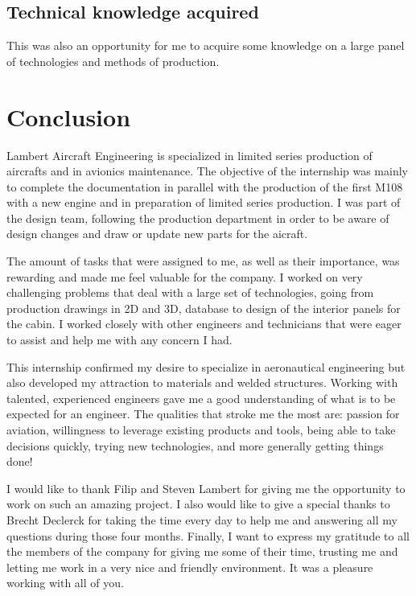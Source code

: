 \documentclass[11pt,a4paper]{article}
\begin{document}
\subsection{Technical knowledge acquired}
This was also an opportunity for me to acquire some knowledge on a large panel of technologies and methods of production.

\newpage

\section{Conclusion}
Lambert Aircraft Engineering is specialized in limited series production of aircrafts and in avionics maintenance. The objective of the internship was mainly to complete the documentation in parallel with the production of the first M108 with a new engine and in preparation of limited series production. I was part of the design team, following the production department in order to be aware of design changes and draw or update new parts for the aicraft.

\bigskip

The amount of tasks that were assigned to me, as well as their importance, was rewarding and made me feel valuable for the company. I worked on very challenging problems that deal with a large set of technologies, going from production drawings in 2D and 3D, database to design of the interior panels for the cabin. I worked closely with other engineers and technicians that were eager to assist and help me with any concern I had.

\bigskip

This internship confirmed my desire to specialize in aeronautical engineering but also developed my attraction to materials and welded structures. Working with talented, experienced engineers gave me a good understanding of what is to be expected for an engineer. The qualities that stroke me the most are: passion for aviation, willingness to leverage existing products and tools, being able to take decisions quickly, trying new technologies, and more generally getting things done!

\bigskip

I would like to thank Filip and Steven Lambert for giving me the opportunity to work on such an amazing project. I also would like to give a special thanks to Brecht Declerck for taking the time every day to help me and answering all my questions during those four months. Finally, I want to express my gratitude to all the members of the company for giving me some of their time, trusting me and letting me work in a very nice and friendly environment. It was a pleasure working with all of you.
\end{document}
